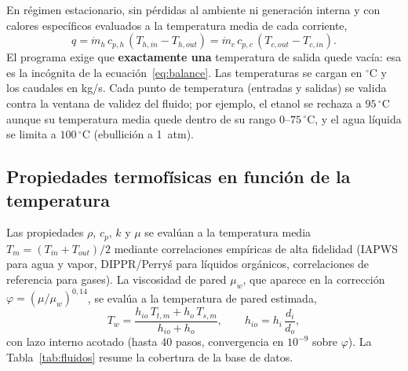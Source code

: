 \documentclass[11pt,a4paper]{article}
\begin{document}
En r\'egimen estacionario, sin p\'erdidas al ambiente ni generaci\'on interna y
con calores espec\'ificos evaluados a la temperatura media de cada corriente,
\begin{equation}
q = \dot m_h \, c_{p,h} \, (T_{h,in} - T_{h,out})
  = \dot m_c \, c_{p,c} \, (T_{c,out} - T_{c,in}).
\label{eq:balance}
\end{equation}
El programa exige que \textbf{exactamente una} temperatura de salida quede
vac\'ia: esa es la inc\'ognita de la ecuaci\'on~\eqref{eq:balance}. Las
temperaturas se cargan en $^\circ$C y los caudales en kg/s. Cada punto de
temperatura (entradas y salidas) se valida contra la ventana de validez del
fluido; por ejemplo, el etanol se rechaza a $95\,^\circ$C aunque su temperatura
media quede dentro de su rango $0$--$75\,^\circ$C, y el agua l\'iquida se limita
a $100\,^\circ$C (ebullici\'on a 1~atm).

\subsection{Propiedades termof\'isicas en funci\'on de la temperatura}

Las propiedades $\rho$, $c_p$, $k$ y $\mu$ se eval\'uan a la temperatura media
$T_m = (T_{in}+T_{out})/2$ mediante correlaciones emp\'iricas de alta fidelidad
(IAPWS para agua y vapor, DIPPR/Perry\'s para l\'iquidos org\'anicos,
correlaciones de referencia para gases). La viscosidad de pared $\mu_w$, que
aparece en la correcci\'on $\varphi = (\mu/\mu_w)^{0{,}14}$, se eval\'ua a la
temperatura de pared estimada,
\begin{equation}
T_w = \frac{h_{io}\,T_{t,m} + h_o\,T_{s,m}}{h_{io} + h_o},
\qquad h_{io} = h_i \, \frac{d_i}{d_o},
\end{equation}
con lazo interno acotado (hasta 40 pasos, convergencia en $10^{-9}$ sobre
$\varphi$). La Tabla~\ref{tab:fluidos} resume la cobertura de la base de datos.
\end{document}
